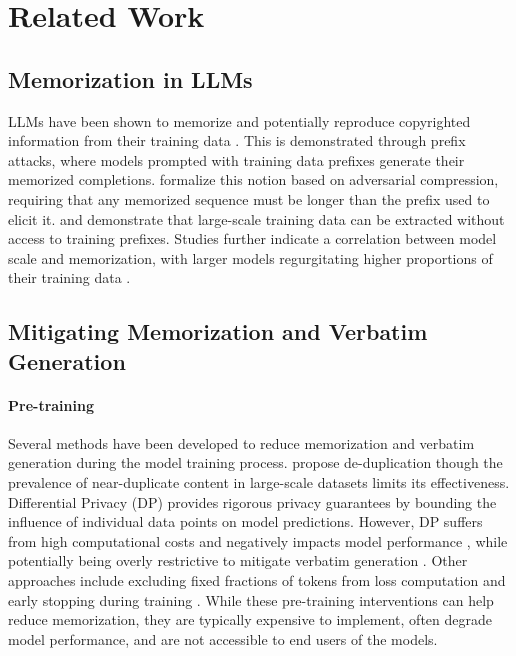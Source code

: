 \section{Related Work}
\subsection{Memorization in LLMs}
LLMs have been shown to memorize and potentially reproduce copyrighted information from their training data \citep{carlini2021extracting, carlini2022quantifying, karamolegkou2023copyright, sok_mem}.  This is demonstrated through prefix attacks, where models prompted with training data prefixes generate their memorized completions.\citet{schwarzschild2024rethinking} formalize this notion based on adversarial compression, requiring that any memorized sequence must be longer than the prefix used to elicit it. \citet{zhou2023quantifyinganalyzingentitylevelmemorization} and \citet{nasr2311scalable} demonstrate that large-scale training data can be extracted without access to training prefixes. Studies further indicate a correlation between model scale and memorization, with larger models regurgitating higher proportions of their training data \citep{carlini2022quantifying, zhou2023quantifyinganalyzingentitylevelmemorization, biderman2024emergent}.


\subsection{Mitigating Memorization and Verbatim Generation}

\paragraph{Pre-training}
Several methods have been developed to reduce memorization and verbatim generation during the model training process. \citet{kandpal2022deduplicating} propose de-duplication though the prevalence of near-duplicate content in large-scale datasets limits its effectiveness. Differential Privacy (DP) \citep{abadi2016deep} provides rigorous privacy guarantees by bounding the influence of individual data points on model predictions. However, DP suffers from high computational costs and negatively impacts model performance \citep{Anil2021}, while potentially being overly restrictive to mitigate verbatim generation \citep{elkin2023can}. Other approaches include excluding fixed fractions of tokens from loss computation \citep{hans2024like} and early stopping during training \citep{mireshghallah2022memorization, pinto2024extracting}. While these pre-training interventions can help reduce memorization, they are typically expensive to implement, often degrade model performance, and are not accessible to end users of the models.

